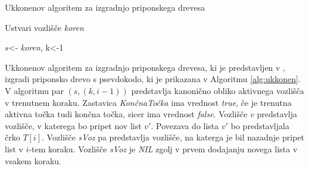 \begin{algorithm}[htb]

    \caption{Ukkonenov algoritem za izgradnjo priponskega drevesa}\label{alg:ukkonen}
    {
        {Ustvari vozlišče \textit{koren}}
        
        {$s$<- \textit{koren}, k<-1}
        
        
    }
\end{algorithm}

Ukkonenov algoritem za izgradnjo priponskega drevesa, ki je predstavljen v \cite{Ukkonen1995}, izgradi priponsko drevo s psevdokodo, ki je prikazana v Algoritmu \ref{alg:ukkonen}.
V algoritmu par $(s, (k,i-1))$ predstavlja kanonično obliko aktivnega vozlišča v trenutnem koraku. Zastavica \textit{KončnaTočka} ima vrednost \textit{true}, če je trenutna aktivna točka tudi končna točka, sicer ima vrednost \textit{false}. Vozlišče $v$ predstavlja vozlišče, v katerega bo pripet nov list $v'$. Povezava do lista $v'$ bo predstavljala črko $T[i]$. Vozlišče \textit{sVoz} pa predstavlja vozlišče, na katerga je bil nazadnje pripet list v $i$-tem koraku. Vozlišče \textit{sVoz} je \textit{NIL} zgolj v prvem dodajanju novega lista v vsakem koraku.


